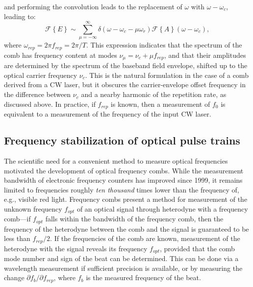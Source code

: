and performing the convolution leads to the replacement of $\omega$ with $\omega-\omega_c$, leading to:
\begin{equation}
\mathcal{F}\left\{E\right\}\sim\sum_{\mu=-\infty}^{\infty}\delta\left(\omega-\omega_c-\mu\omega_r\right)\mathcal{F}\left\{A\right\}(\omega-\omega_c), \label{eq:combspectrum}
\end{equation}
where $\omega_{rep}=2\pi f_{rep}=2\pi/T$. This expression indicates that the spectrum of the comb has frequency content at modes $\nu_\mu=\nu_c+\mu f_{rep}$, and that their amplitudes are determined by the spectrum of the baseband field envelope, shifted up to the optical carrier frequency $\nu_c$. This is the natural formulation in the case of a comb derived from a CW laser, but it obscures the carrier-envelope offset frequency in the difference between $\nu_c$ and a nearby harmonic of the repetition rate, as discussed above. In practice, if $f_{rep}$ is known, then a measurement of $f_0$ is equivalent to a measurement of the frequency of the input CW laser.


\subsection{Frequency stabilization of optical pulse trains}
\label{sec:f2f}

The scientific need for a convenient method to measure optical frequencies motivated the development of optical frequency combs. While the measurement bandwidth of electronic frequency counters has improved since 1999, it remains limited to frequencies roughly \textit{ten thousand} times lower than the frequency of, e.g., visible red light. Frequency combs present a method for measurement of the unknown frequency $f_{opt}$ of an optical signal through heterodyne with a frequency comb---if $f_{opt}$ falls within the bandwidth of the frequency comb, then the frequency of the heterodyne between the comb and the signal is guaranteed to be less than $f_{rep}/2$. If the frequencies of the comb are known, measurement of the heterodyne with the signal reveals its frequency  $f_{opt}$, provided that the comb mode number and sign of the beat can be determined. This can be done via a wavelength measurement if sufficient precision is available, or by measuring the change $\partial f_b/\partial f_{rep}$, where $f_b$ is the measured frequency of the beat.

